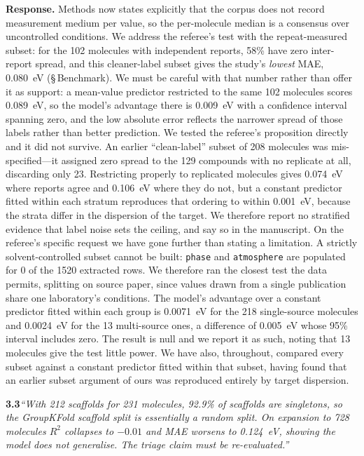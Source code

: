 \documentclass[12pt,a4paper]{letter}
\begin{document}
\smallskip
\noindent\textbf{Response.}
Methods now states explicitly that the corpus does not record measurement medium
per value, so the per-molecule median is a consensus over uncontrolled
conditions. We address the referee's test with the repeat-measured subset: for
the \num{102} molecules with independent reports, \num{58}\% have zero
inter-report spread, and this cleaner-label subset gives the study's
\emph{lowest} MAE, \num{0.080}~eV (\S\,Benchmark). We must be careful with that number
rather than offer it as support: a mean-value predictor restricted to the same
\num{102} molecules scores \num{0.089}~eV, so the model's advantage there is
\num{0.009}~eV with a confidence interval spanning zero, and the low absolute error
reflects the narrower spread of those labels rather than better prediction.
We tested the referee's proposition directly and it did not survive. An earlier
``clean-label'' subset of \num{208} molecules was mis-specified---it assigned zero spread
to the \num{129} compounds with no replicate at all, discarding only \num{23}.
Restricting properly to replicated molecules gives \num{0.074}~eV where reports agree and
\num{0.106}~eV where they do not, but a constant predictor fitted within each stratum
reproduces that ordering to within \num{0.001}~eV, because the strata differ in the
dispersion of the target. We therefore report no stratified evidence that label noise sets
the ceiling, and say so in the manuscript. On the referee's specific request we have gone further than stating a limitation. A
strictly solvent-controlled subset cannot be built: \texttt{phase} and
\texttt{atmosphere} are populated for \num{0} of the \num{1520} extracted rows. We
therefore ran the closest test the data permits, splitting on source paper, since values
drawn from a single publication share one laboratory's conditions. The model's advantage
over a constant predictor fitted within each group is \num{0.0071}~eV for the
\num{218} single-source molecules and \num{0.0024}~eV for the \num{13} multi-source
ones, a difference of \num{0.005}~eV whose \num{95}\% interval includes zero. The
result is null and we report it as such, noting that \num{13} molecules give the test
little power. We have also, throughout, compared every subset against a constant
predictor fitted within that subset, having found that an earlier subset argument of ours
was reproduced entirely by target dispersion.

\medskip
\noindent\textbf{3.3}\quad\textit{``With \num{212} scaffolds for \num{231}
molecules, \num{92.9}\% of scaffolds are singletons, so the GroupKFold scaffold
split is essentially a random split. On expansion to \num{728} molecules $R^2$
collapses to $-0.01$ and MAE worsens to \num{0.124}~eV, showing the model does
not generalise. The triage claim must be re-evaluated.''}
\end{document}

